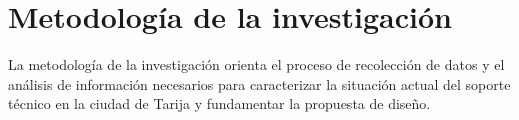 \section{Metodología de la investigación}

La metodología de la investigación orienta el proceso de recolección de datos y el análisis de información necesarios para caracterizar la situación actual del soporte técnico en la ciudad de Tarija y fundamentar la propuesta de diseño.